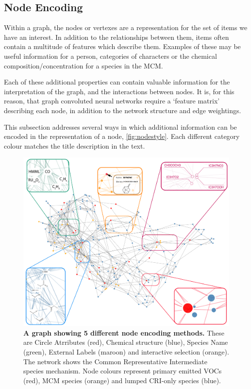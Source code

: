 \subsection{Node Encoding}
Within a graph, the nodes or vertexes are a representation for the set of items we have an interest. In addition to the relationships between them, items often contain a multitude of features which describe them. Examples of these may be useful information for a person, categories of characters or the chemical composition/concentration for a species in the MCM.

Each of these additional properties can contain valuable information for the interpretation of the graph, and the interactions between nodes. It is, for this reason, that graph convoluted neural networks \citep{t2gcn} require a  `feature matrix' describing each node, in addition to the network structure and edge weightings.

This subsection addresses several ways in which additional information can be encoded in the representation of a node, \autoref{fig:nodestyle}. Each different category colour matches the title description in the text.


\begin{figure}[H]
     \centering
     \includegraphics[width=\textwidth]{figures_c1/NODES_001f3d-00775b-ff9000-f71735-c10053.pdf}
        \caption{\textbf{A graph showing 5 different node encoding methods.} These are Circle Atrributes (red), Chemical structure (blue), Species Name (green), External Labels (maroon) and interactive selection (orange). The network shows the Common Representative Intermediate species \citep{cri} mechanism. Node colours represent primary emitted VOCs (red), MCM species (orange) and lumped CRI-only species (blue).  }
      \label{fig:nodestyle}
\end{figure}





